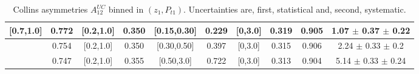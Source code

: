 \documentclass[aps,prX,preprint,groupedaddress,linenumbers]{revtex4-1}
\begin{document}
\begin{table}[H]
\begin{tabular}{|c| c| c| c| c| c| c| c| c| c|}
[0.7,1.0]	&	0.772	&	[0.2,1.0]	&	0.350	&	[0.15,0.30]	&	0.229	&	[0,3.0]	&	0.319	&	0.905	& 1.07  $\pm$ 0.37  $\pm$ 0.22  	\\ \hline
[0.7,1.0]	&	0.754	&	[0.2,1.0]	&	0.350	&	[0.30,0.50]	&	0.397	&	[0,3.0]	&	0.315	&	0.906	& 2.24  $\pm$ 0.33  $\pm$ 0.2   	\\ \hline
[0.7,1.0]	&	0.747	&	[0.2,1.0]	&	0.355	&	[0.50,3.0]	&	0.722	&	[0,3.0]	&	0.313	&	0.904	& 5.14  $\pm$ 0.33  $\pm$ 0.24  	\\ \hline
\end{tabular}
\caption[Collins asymmetries $A_{12}^{UC}$ binned in $(z_{1},P_{t1})$]{Collins asymmetries $A_{12}^{UC}$ binned in $(z_{1},P_{t1})$. Uncertainties are, first, statistical and, second, systematic.}\label{tab:finalucptbins}
\end{table}
\end{document}

